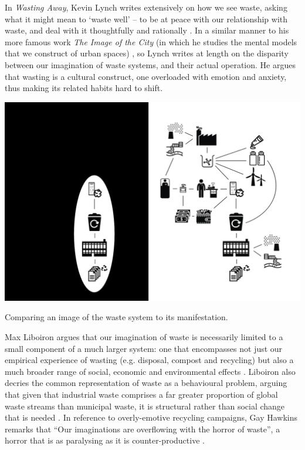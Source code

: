 \documentclass[nofonts,nols,justified,nobib]{tufte-book}
\begin{document}
In \emph{Wasting Away}\cite{lynch_wasting_1990}, Kevin Lynch writes extensively on how we see waste, asking what it might mean to `waste well' -- to be at peace with our relationship with waste, and deal with it thoughtfully and rationally . In a similar manner to his more famous work \emph{The Image of the City} (in which he studies the mental models that we construct of urban spaces) \cite{lynch_image_1960}, so Lynch writes at length on the disparity between our imagination of waste systems, and their actual operation. He argues that wasting is a cultural construct, one overloaded with emotion and anxiety, thus making its related habits hard to shift.

\begin{marginfigure}
\includegraphics[width=\textwidth]{img/1/waste-complexity.png}
\caption{Comparing an image of the waste system to its manifestation. \cite{liboiron_why_2014}}
\end{marginfigure}


Max Liboiron argues that our imagination of waste is necessarily limited to a small component of a much larger system: one that encompasses not just our empirical experience of wasting (e.g. disposal, compost and recycling) but also a much broader range of social, economic and environmental effects \cite{liboiron_why_2014, liboiron_mapping_2014}. Liboiron also decries the common representation of waste as a behavioural problem, arguing that given that industrial waste comprises a far greater proportion of global waste streams than municipal waste, it is structural rather than social change that is needed \cite{liboiron_against_2014}. In reference to overly-emotive recycling campaigns, Gay Hawkins remarks that ``Our imaginations are overflowing with the horror of waste'', a horror that is as paralysing as it is counter-productive \cite{hawkins_ethics_2006}.
\end{document}
